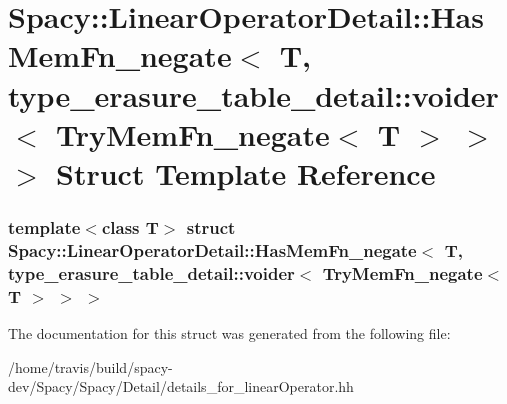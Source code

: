 \hypertarget{structSpacy_1_1LinearOperatorDetail_1_1HasMemFn__negate_3_01T_00_01type__erasure__table__detail_cf25722904f7a168a81cbcce56202e41}{\section{\-Spacy\-:\-:\-Linear\-Operator\-Detail\-:\-:\-Has\-Mem\-Fn\-\_\-negate$<$ \-T, type\-\_\-erasure\-\_\-table\-\_\-detail\-:\-:voider$<$ \-Try\-Mem\-Fn\-\_\-negate$<$ \-T $>$ $>$ $>$ \-Struct \-Template \-Reference}
\label{structSpacy_1_1LinearOperatorDetail_1_1HasMemFn__negate_3_01T_00_01type__erasure__table__detail_cf25722904f7a168a81cbcce56202e41}
}
\subsubsection*{template$<$class T$>$ struct Spacy\-::\-Linear\-Operator\-Detail\-::\-Has\-Mem\-Fn\-\_\-negate$<$ T, type\-\_\-erasure\-\_\-table\-\_\-detail\-::voider$<$ Try\-Mem\-Fn\-\_\-negate$<$ T $>$ $>$ $>$}



\-The documentation for this struct was generated from the following file\-:\begin{DoxyCompactItemize}
\item 
/home/travis/build/spacy-\/dev/\-Spacy/\-Spacy/\-Detail/details\-\_\-for\-\_\-linear\-Operator.\-hh\end{DoxyCompactItemize}

